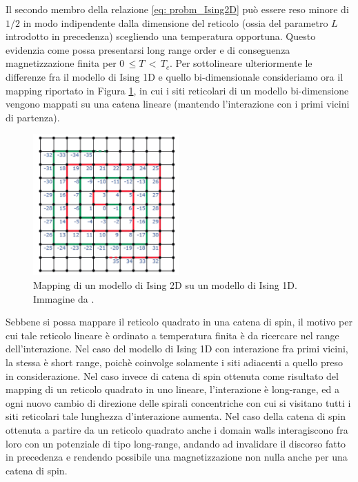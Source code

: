 Il secondo membro della relazione \eqref{eq: probm_Ising2D} può essere reso minore di $1/2$ in modo indipendente dalla dimensione del reticolo 
(ossia del parametro $L$ introdotto in precedenza) scegliendo una temperatura opportuna. Questo evidenzia come possa 
presentarsi long range order e di conseguenza magnetizzazione finita per $0\,\leq T\,<\,T_c$. Per sottolineare ulteriormente le 
differenze fra il modello di Ising 1D e quello bi-dimensionale consideriamo ora il mapping riportato in Figura \ref{fig: map_2to1_Ising}, 
in cui i siti reticolari di un modello bi-dimensione vengono mappati su una catena lineare (mantendo l'interazione con i primi 
vicini di partenza).

\begin{figure}[H]
    \centering
    \includegraphics[width=0.5\textwidth]{Immagini/map_2to1_Ising.png}
    \caption{Mapping di un modello di Ising 2D su un modello di Ising 1D. Immagine da \cite{galliFSA}.}
    \label{fig: map_2to1_Ising}
\end{figure}

Sebbene si possa mappare il reticolo quadrato in una catena di spin, il motivo per cui tale reticolo lineare è ordinato a temperatura 
finita è da ricercare nel range dell'interazione. Nel caso del modello di Ising 1D con interazione fra primi vicini, la stessa è short 
range, poichè coinvolge solamente i siti adiacenti a quello preso in considerazione. Nel caso invece di catena di spin ottenuta come 
risultato del mapping di un reticolo quadrato in uno lineare, l'interazione è long-range, ed a ogni nuovo cambio di direzione delle 
spirali concentriche con cui si visitano tutti i siti reticolari tale lunghezza d'interazione aumenta. Nel caso della catena di 
spin ottenuta a partire da un reticolo quadrato anche i domain walls interagiscono fra loro con un potenziale di tipo long-range, andando 
ad invalidare il discorso fatto in precedenza e rendendo possibile una magnetizzazione non nulla anche per una catena di spin. 





